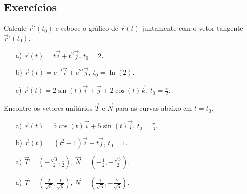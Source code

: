 \subsection*{Exercícios}
\begin{exer}Calcule $\vec{r}'(t_0)$ e esboce o gráfico de $\vec{r}(t)$ juntamente com o vetor tangente $\vec{r}'(t_0)$.
\begin{itemize}
 \item[a)] $\vec{r}(t)=t\vec{i}+t^2\vec{j}$, $t_0=2$.
 \item[b)] $\vec{r}(t)=e^{-t}\vec{i}+e^{2t}\vec{j}$, $t_0=\ln(2)$.
 \item[c)] $\vec{r}(t)=2\sin(t)\vec{i}+\vec{j}+2\cos(t)\vec{k}$, $t_0=\frac{\pi}{2}$.
 \end{itemize}
\end{exer}
\begin{exer}
Encontre os vetores unitários $\vec{T}$ e $\vec{N}$ para as curvas abaixo em $t=t_0$.
\begin{itemize}
 \item[a)] $\vec{r}(t)=5\cos(t)\vec{i}+5\sin(t)\vec{j}$, $t_0=\frac{\pi}{3}$.
 \item[b)] $\vec{r}(t)=(t^2-1)\vec{i}+t\vec{j}$, $t_0=1$.
\end{itemize}
\end{exer}
\begin{resp}
 \begin{itemize}
  \item[a)]$\vec{T}=\left(-\frac{\sqrt{3}}{2},\frac{1}{2}\right)$, $\vec{N}=\left(-\frac{1}{2},-\frac{\sqrt{3}}{2}\right)$.
  \item[a)]$\vec{T}=\left(\frac{2}{\sqrt{5}},\frac{1}{\sqrt{5}}\right)$, $\vec{N}=\left(\frac{1}{\sqrt{5}},-\frac{2}{\sqrt{5}}\right)$.
 \end{itemize}

\end{resp}

